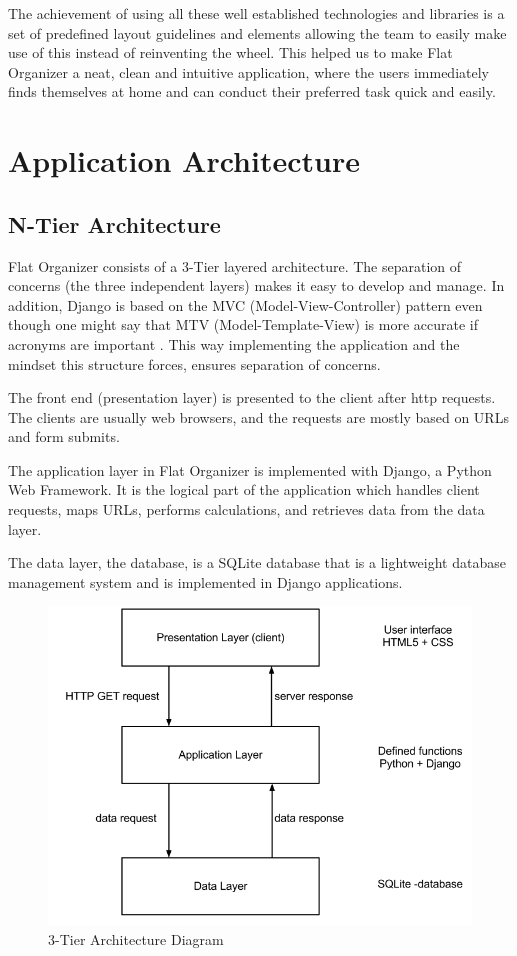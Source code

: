 \documentclass{sig-alt-release2}
\begin{document}
The achievement of using all these well established technologies and libraries
is a set of predefined layout guidelines and elements allowing the team to
easily make use of this instead of reinventing the wheel. This helped us to make
Flat Organizer a neat, clean and intuitive application, where the users
immediately finds themselves at home and can conduct their preferred task quick
and easily.

\section{Application Architecture}

\subsection{N-Tier Architecture}
Flat Organizer consists of a 3-Tier layered architecture. The separation of
concerns (the three independent layers) makes it easy to develop and manage. In
addition, Django is based on the MVC (Model-View-Controller) pattern even though
one might say that MTV (Model-Template-View) is more accurate if acronyms are
important \cite{django1}. This way implementing the application and the
mindset this structure forces, ensures separation of concerns.

The front end (presentation layer) is presented to the client
after http requests. The clients are usually web browsers, and the requests are
mostly based on URLs and form submits.

The application layer in Flat Organizer is implemented with Django, a Python Web
Framework. It is the logical part of the application which handles client
requests, maps URLs, performs calculations, and retrieves data from the data
layer.

The data layer, the database, is a SQLite database that is a lightweight
database management system and is implemented in Django applications.

\begin{figure}[!ht]
\centering
\includegraphics[scale=0.3]{3tier}
\caption{ 3-Tier Architecture Diagram}
\label{fig:3tier}
\end{figure}
\end{document}

